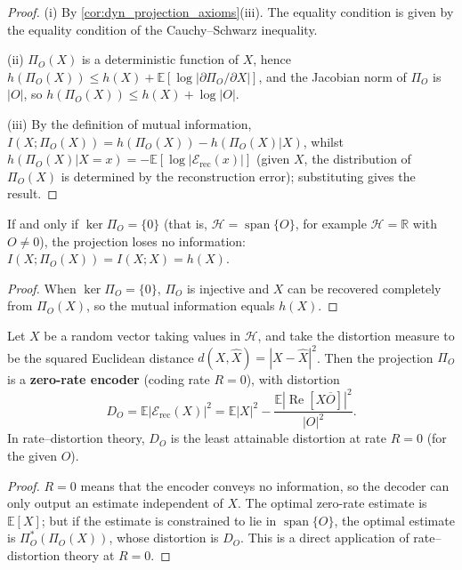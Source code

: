 \begin{proof}
(i) By \cref{cor:dyn_projection_axioms}(iii). The equality condition is given by the equality condition of the Cauchy--Schwarz inequality.

(ii) $\Pi_O(X)$ is a deterministic function of $X$, hence $h(\Pi_O(X))\le h(X)+\mathbb E[\log|\partial\Pi_O/\partial X|]$, and the Jacobian norm of $\Pi_O$ is $|O|$, so $h(\Pi_O(X))\le h(X)+\log|O|$.

(iii) By the definition of mutual information, $I(X;\Pi_O(X))=h(\Pi_O(X))-h(\Pi_O(X)|X)$, whilst $h(\Pi_O(X)|X=x)=-\mathbb E[\log|\mathcal E_{\text{rec}}(x)|]$ (given $X$, the distribution of $\Pi_O(X)$ is determined by the reconstruction error); substituting gives the result.
\end{proof}

\begin{corollary}\label{cor:dyn_ideal_observer}
If and only if $\ker\Pi_O=\{0\}$ (that is, $\mathcal H=\operatorname{span}\{O\}$, for example $\mathcal H=\mathbb R$ with $O\neq 0$), the projection loses no information: $I(X;\Pi_O(X))=I(X;X)=h(X)$.
\end{corollary}

\begin{proof}
When $\ker\Pi_O=\{0\}$, $\Pi_O$ is injective and $X$ can be recovered completely from $\Pi_O(X)$, so the mutual information equals $h(X)$.
\end{proof}

\begin{theorem}\label{thm:dyn_projection_rate_distortion}
Let $X$ be a random vector taking values in $\mathcal H$, and take the distortion measure to be the squared Euclidean distance $d(X,\widehat X)=|X-\widehat X|^2$. Then the projection $\Pi_O$ is a \textbf{zero-rate encoder} (coding rate $R=0$), with distortion
\[
D_O=\mathbb E|\mathcal E_{\text{rec}}(X)|^2=\mathbb E|X|^2-\frac{\mathbb E|\operatorname{Re}[X\overline O]|^2}{|O|^2}.
\]
In rate--distortion theory, $D_O$ is the least attainable distortion at rate $R=0$ (for the given $O$).
\end{theorem}

\begin{proof}
$R=0$ means that the encoder conveys no information, so the decoder can only output an estimate independent of $X$. The optimal zero-rate estimate is $\mathbb E[X]$; but if the estimate is constrained to lie in $\operatorname{span}\{O\}$, the optimal estimate is $\Pi_O^\ast(\Pi_O(X))$, whose distortion is $D_O$. This is a direct application of rate--distortion theory at $R=0$.
\end{proof}

